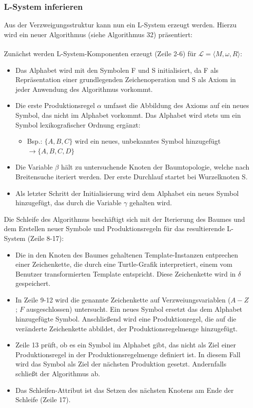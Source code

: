 \subsubsection*{L-System inferieren}
Aus der Verzweigungsstruktur kann nun ein L-System erzeugt werden.
Hierzu wird ein neuer Algorithmus (siehe Algorithmus 32) präsentiert:\\~\\
Zunächst werden L-System-Komponenten erzeugt (Zeile 2-6) für $\mathcal{L}=\langle M,\omega,R \rangle$:
\begin{itemize}
    \item Das Alphabet wird mit den Symbolen F und S initialisiert, da F als Repräsentation einer grundlegenden
    Zeichenoperation und S als Axiom in jeder Anwendung des Algorithmus vorkommt.
    \item Die erste Produktionsregel $\alpha$ umfasst die Abbildung des Axioms auf ein neues Symbol, das nicht im Alphabet
    vorkommt.
    Das Alphabet wird stets um ein Symbol lexikografischer Ordnung ergänzt:
    \begin{itemize}
        \item Bsp.: $\{A,B,C\}$ wird ein neues, unbekanntes Symbol hinzugefügt $\rightarrow \{A,B,C,D\}$
    \end{itemize}
    \item Die Variable $\beta$ hält zu untersuchende Knoten der Baumtopologie, welche nach Breitensuche iteriert werden.
    Der erste Durchlauf startet bei Wurzelknoten S.
    \item Als letzter Schritt der Initialisierung wird dem Alphabet ein neues Symbol hinzugefügt, das durch die Variable
    $\gamma$ gehalten wird.
\end{itemize}
Die Schleife des Algorithmus beschäftigt sich mit der Iterierung des Baumes und dem Erstellen neuer Symbole und
Produktionsregeln für das resultierende L-System (Zeile 8-17):
\begin{itemize}
    \item Die in den Knoten des Baumes gehaltenen Template-Instanzen entprechen einer Zeichenkette, die durch eine
    Turtle-Grafik interpretiert, einem vom Benutzer transformierten Template entspricht.
    Diese Zeichenkette wird in $\delta$ gespeichert.
    \item In Zeile 9-12 wird die genannte Zeichenkette auf Verzweiungsvariablen ($A-Z$; $F$ ausgeschlossen) untersucht.
    Ein neues Symbol ersetzt das dem Alphabet hinzugefügte Symbol. Anschließend wird eine Produktionregel,
    die auf die veränderte Zeichenkette abbildet, der Produktionsregelmenge hinzugefügt.
    \item Zeile 13 prüft, ob es ein Symbol im Alphabet gibt, das nicht als Ziel einer Produktionsregel in der Produktionsregelmenge
    definiert ist. In diesem Fall wird das Symbol als Ziel der nächsten Produktion gesetzt. Andernfalls schließt der Algorithmus ab.
    \item Das Schleifen-Attribut ist das Setzen des nächsten Knotens am Ende der Schleife (Zeile 17).
\end{itemize}

